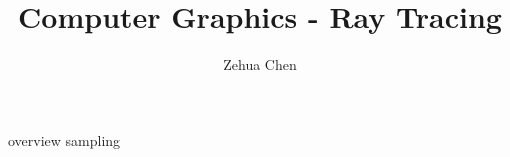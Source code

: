 \documentclass[letterpaper, 11pt]{report}
\title{Computer Graphics - Ray Tracing}
\author{Zehua Chen}
\begin{document}
  \maketitle
  \tableofcontents

  {overview}
  {sampling}

  \newpage
  \printglossary
\end{document}
